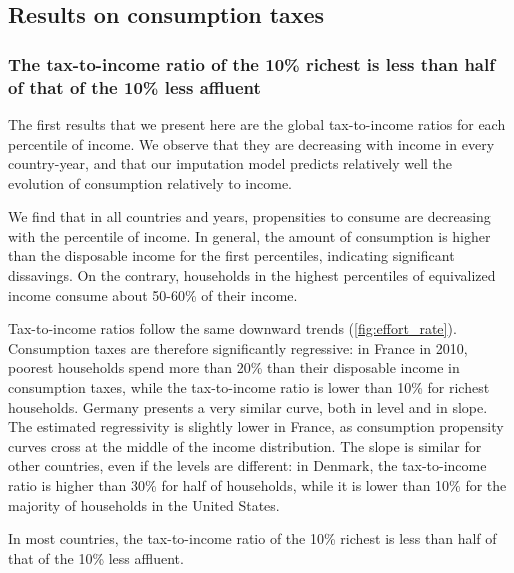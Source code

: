 \documentclass[12pt]{article}
\begin{document}
\subsection{Results on consumption taxes}

\subsubsection{The tax-to-income ratio of the 10\% richest is less than half of that of the 10\% less affluent}

The first results that we present here are the global tax-to-income ratios for each percentile of income. We observe that they are decreasing with income in every country-year, and that our imputation model predicts relatively well the evolution of consumption relatively to income.

We find that in all countries and years, propensities to consume are decreasing with the percentile of income. In general, the amount of consumption is higher than the disposable income for the first percentiles, indicating significant dissavings. On the contrary, households in the highest percentiles of equivalized income consume about 50-60\% of their income. 

Tax-to-income ratios follow the same downward trends (\cref{fig:effort_rate}). Consumption taxes are therefore significantly regressive: in France in 2010, poorest households spend more than 20\% than their disposable income in consumption taxes, while the tax-to-income ratio is lower than 10\% for richest households. Germany presents a very similar curve, both in level and in slope. The estimated regressivity is slightly lower in France, as consumption propensity curves cross at the middle of the income distribution. The slope is similar for other countries, even if the levels are different: in Denmark, the tax-to-income ratio is higher than 30\% for half of households, while it is lower than 10\% for the majority of households in the United States.

In most countries, the tax-to-income ratio of the 10\% richest is less than half of that of the 10\% less affluent.
\end{document}
